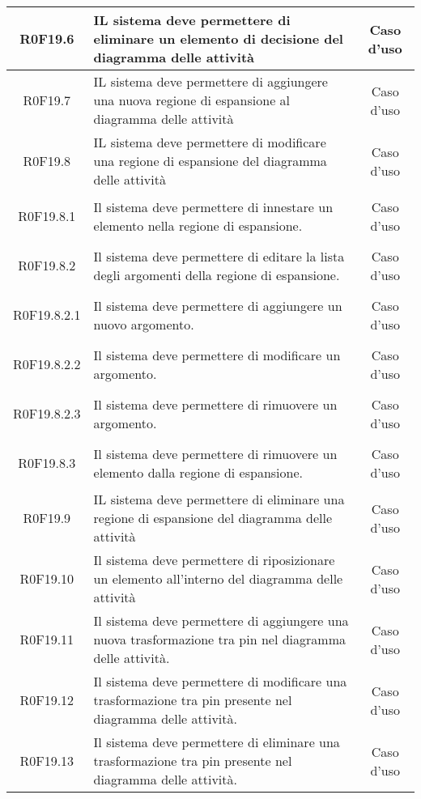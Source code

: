 \documentclass[../AnalisiDeiRequisiti.tex]{subfiles}
\begin{document}
\begin{longtable}{|c|>{\centering}p{7cm}|c|}
	\hypertarget{R0F19.6}{R0F19.6} & IL sistema deve permettere di eliminare un elemento di decisione del diagramma delle attività & Caso d'uso \\ \hline
	\hypertarget{R0F19.7}{R0F19.7} & IL sistema deve permettere di aggiungere una nuova regione di espansione al diagramma delle attività & Caso d'uso \\ \hline
	\hypertarget{R0F19.8}{R0F19.8} & IL sistema deve permettere di modificare una regione di espansione del diagramma delle attività & Caso d'uso \\ \hline
	\hypertarget{R0F19.8.1}{R0F19.8.1} & Il sistema deve permettere di innestare un elemento nella regione di espansione. & Caso d'uso \\ \hline
	\hypertarget{R0F19.8.2}{R0F19.8.2} & Il sistema deve permettere di editare la lista degli argomenti della regione di espansione. & Caso d'uso \\ \hline
	\hypertarget{R0F19.8.2.1}{R0F19.8.2.1} & Il sistema deve permettere di aggiungere un nuovo argomento. & Caso d'uso \\ \hline
	\hypertarget{R0F19.8.2.2}{R0F19.8.2.2} & Il sistema deve permettere di modificare un argomento. & Caso d'uso \\ \hline
	\hypertarget{R0F19.8.2.3}{R0F19.8.2.3} & Il sistema deve permettere di rimuovere un argomento. & Caso d'uso \\ \hline
	\hypertarget{R0F19.8.3}{R0F19.8.3} & Il sistema deve permettere di rimuovere un elemento dalla regione di espansione. & Caso d'uso \\ \hline
	\hypertarget{R0F19.9}{R0F19.9} & IL sistema deve permettere di eliminare una regione di espansione del diagramma delle attività & Caso d'uso \\ \hline
	\hypertarget{R0F19.10}{R0F19.10} & Il sistema deve permettere di riposizionare un elemento all'interno del diagramma delle attività & Caso d'uso \\ \hline
	\hypertarget{R0F19.11}{R0F19.11} & Il sistema deve permettere di aggiungere una nuova trasformazione tra pin nel diagramma delle attività. & Caso d'uso \\ \hline
	\hypertarget{R0F19.12}{R0F19.12} & Il sistema deve permettere di modificare una trasformazione tra pin presente nel diagramma delle attività. & Caso d'uso \\ \hline
	\hypertarget{R0F19.13}{R0F19.13} & Il sistema deve permettere di eliminare una trasformazione tra pin presente nel diagramma delle attività. & Caso d'uso \\ \hline

\end{longtable}
\end{document}
